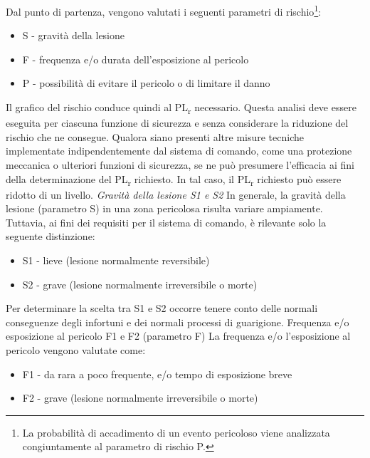 \begin{center}
    \begin{minipage}{\textwidth}
        \centering
        \captionsetup{hypcap=false}
        \resizebox{0.92\textwidth}{!}{}
        \label{fig:05-09}
    \end{minipage}
\end{center}

Dal punto di partenza, vengono valutati i seguenti parametri di rischio\footnote{La probabilità di accadimento di un evento pericoloso viene analizzata congiuntamente al parametro di rischio P.}:
\begin{itemize}
    \item S - gravità della lesione
    \item F - frequenza e/o durata dell'esposizione al pericolo
    \item P - possibilità di evitare il pericolo o di limitare il danno
\end{itemize}
Il grafico del rischio conduce quindi al PL\textsubscript{\small r} necessario. Questa analisi deve essere eseguita per ciascuna funzione di sicurezza e senza considerare la riduzione del rischio che ne consegue. Qualora siano presenti altre misure tecniche implementate indipendentemente dal sistema di comando, come una protezione meccanica o ulteriori funzioni di sicurezza, se ne può presumere l'efficacia ai fini della determinazione del PL\textsubscript{\small r} richiesto. In tal caso, il PL\textsubscript{\small r} richiesto può essere ridotto di un livello.
\textit{Gravità della lesione S1 e S2}
In generale, la gravità della lesione (parametro S) in una zona pericolosa risulta variare ampiamente. Tuttavia, ai fini dei requisiti per il sistema di comando, è rilevante solo la seguente distinzione:
\begin{itemize}
    \item S1 - lieve (lesione normalmente reversibile)
    \item S2 - grave (lesione normalmente irreversibile o morte)
\end{itemize}
Per determinare la scelta tra S1 e S2 occorre tenere conto delle normali conseguenze degli infortuni e dei normali processi di guarigione.
Frequenza e/o esposizione al pericolo F1 e F2 (parametro F)
La frequenza e/o l'esposizione al pericolo vengono valutate come:
\begin{itemize}
    \item F1 - da rara a poco frequente, e/o tempo di esposizione breve
    \item F2 - grave (lesione normalmente irreversibile o morte)
\end{itemize}

